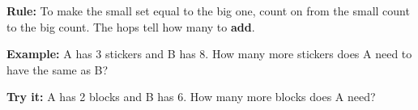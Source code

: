 \documentclass[12pt]{article}
\begin{document}

\begin{formulabox}
\textbf{Rule:} To make the small set equal to the big one, count on from the
small count to the big count. The hops tell how many to \textbf{add}.
\end{formulabox}

\begin{examplebox}
\textbf{Example:} \quad A has 3 stickers and B has 8. How many more stickers
does A need to have the same as B?
\end{examplebox}

\begin{tryitbox}
\textbf{Try it:} \quad A has 2 blocks and B has 6. How many more blocks does A
need?\\[2pt]
\end{tryitbox}
\end{document}
